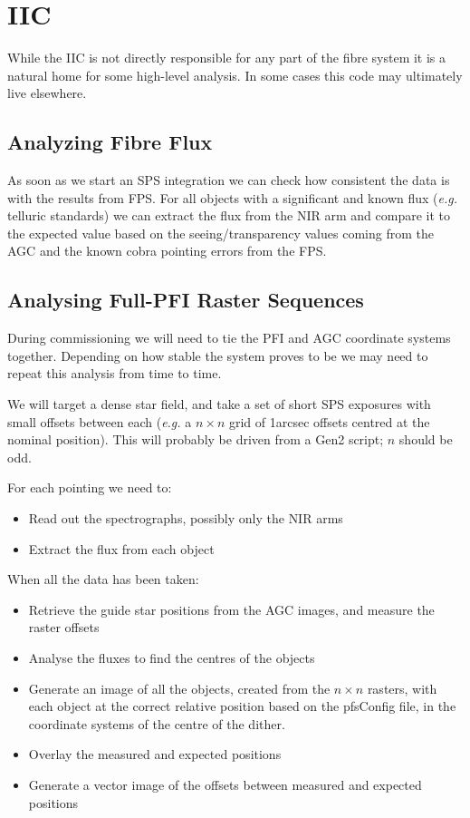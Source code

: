 \documentclass[12pt]{article}
\newcommand{\eg}{\textit{e.g.}\xspace}
\newcommand{\AGC}{\gls{AGC}\xspace}
\newcommand{\IIC}{\gls{IIC}\xspace}
\newcommand{\FPS}{\gls{FPS}\xspace}
\newcommand{\PFI}{\gls{PFI}\xspace}
\newcommand{\SPS}{\gls{SPS}\xspace}
\begin{document}
\section{IIC}
\label{sec:IIC}

While the \IIC is not directly responsible for any part of the fibre system it is a natural home
for some high-level analysis.  In some cases this code may ultimately live elsewhere.

\subsection{Analyzing Fibre Flux}

As soon as we start an \SPS integration we can check how consistent the data is with the
results from \FPS.  For all objects with a significant and known flux (\eg telluric standards) we
can extract the flux from the \gls{NIR} arm and compare it to the expected value based on the
seeing/transparency values coming from the \AGC and the known cobra pointing errors from the \FPS.

\subsection{Analysing Full-PFI Raster Sequences}

During commissioning we will need to tie the \PFI and \AGC coordinate systems together.   Depending
on how stable the system proves to be we may need to repeat this analysis from time to time.

We will target a dense star field, and take a set of short \SPS exposures with small offsets
between each (\eg a $n\times n$ grid of 1arcsec offsets centred at the nominal position).  This
will probably be driven from a \gls{Gen2} script; $n$ should be odd.

For each pointing we need to:
\begin{itemize}
\item Read out the spectrographs, possibly only the \gls{NIR} arms
\item Extract the flux from each object
\end{itemize}

When all the data has been taken:
\begin{itemize}
\item Retrieve the guide star positions from the \AGC images, and measure the raster offsets
\item Analyse the fluxes to find the centres of the objects
\item Generate an image of all the objects, created from the $n\times n$ rasters, with each object
  at the correct relative position based on the \gls{pfsConfig} file, in the coordinate systems
  of the centre of the dither.
\item Overlay the measured and expected positions
\item Generate a vector image of the offsets between measured and expected positions
\end{itemize}
\end{document}
